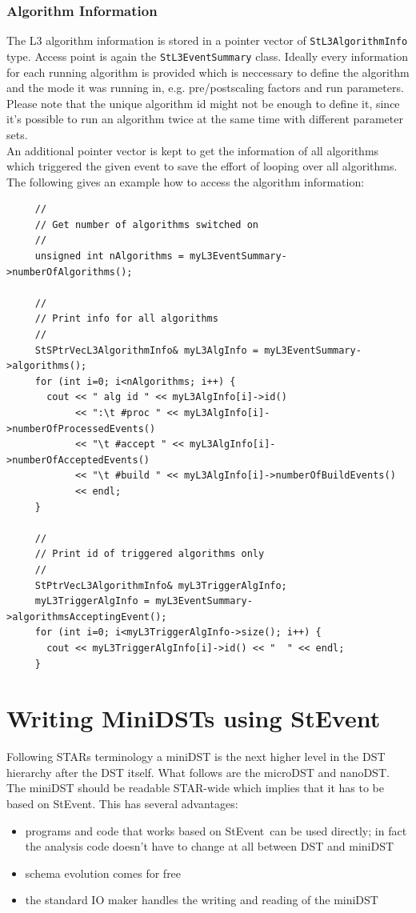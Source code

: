 \documentclass[twoside]{article}
\newcommand{\StEvent}{\textsf{StEvent}}
\begin{document}
\subsubsection{Algorithm Information}
The L3 algorithm information is stored in a pointer vector of
\texttt{StL3AlgorithmInfo} type. Access point is again the
\texttt{StL3EventSummary} class. Ideally every information for each
running algorithm is provided which is neccessary to define the
algorithm and the mode it was running in, e.g. pre/postscaling factors
and run parameters. Please note that the unique algorithm id might not
be enough to define it, since it's possible to run an algorithm twice
at the same time with different parameter sets.\\
An additional pointer vector is kept to get the information of all
algorithms which triggered the given event to save the effort of
looping over all algorithms. The following gives an example how to
access the algorithm information:
\begin{verbatim}
     //
     // Get number of algorithms switched on
     //
     unsigned int nAlgorithms = myL3EventSummary->numberOfAlgorithms(); 

     //
     // Print info for all algorithms
     //
     StSPtrVecL3AlgorithmInfo& myL3AlgInfo = myL3EventSummary->algorithms(); 
     for (int i=0; i<nAlgorithms; i++) {
       cout << " alg id " << myL3AlgInfo[i]->id()
            << ":\t #proc " << myL3AlgInfo[i]->numberOfProcessedEvents()
            << "\t #accept " << myL3AlgInfo[i]->numberOfAcceptedEvents()
            << "\t #build " << myL3AlgInfo[i]->numberOfBuildEvents()
            << endl;
     }

     //
     // Print id of triggered algorithms only
     //
     StPtrVecL3AlgorithmInfo& myL3TriggerAlgInfo;
     myL3TriggerAlgInfo = myL3EventSummary->algorithmsAcceptingEvent();
     for (int i=0; i<myL3TriggerAlgInfo->size(); i++) {
       cout << myL3TriggerAlgInfo[i]->id() << "  " << endl;
     }
\end{verbatim}

\clearpage

\section{Writing MiniDSTs using StEvent}
\label{sec:miniDST}
Following STARs terminology a miniDST is the next higher level in the
DST hierarchy after the DST itself. What follows are the
microDST and nanoDST.  The miniDST should be readable STAR-wide which
implies that it has to be based on \StEvent. This has several
advantages:
\begin{itemize}
\item programs and code that works based on \StEvent\ can be used
    directly; in fact the analysis code doesn't have to change at all
    between DST and miniDST
\item schema evolution comes for free
\item the standard IO maker handles the writing and reading of the
    miniDST
\end{itemize}
\end{document}
